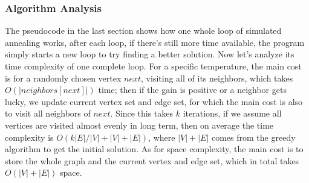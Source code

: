 \documentclass[acmlarge]{acmart}
\begin{document}

\subsubsection{Algorithm Analysis}

The pseudocode in the last section shows how one whole loop of simulated annealing works, after each loop, if there's still more time available, the program simply starts a new loop to try finding a better solution. Now let's analyze its time complexity of one complete loop. For a specific temperature, the main cost is for a randomly chosen vertex $next$, visiting all of its neighbors, which takes $O(|neighbors[next]|)$ time; then if the gain is positive or a neighbor gets lucky, we update current vertex set and edge set, for which the main cost is also to visit all neighbors of $next$. Since this takes $k$ iterations, if we assume all vertices are visited almost evenly in long term, then on average the time complexity is $O(k|E|/|V| + |V| + |E|)$, where $|V|+|E|$ comes from the greedy algorithm to get the initial solution. As for space complexity, the main cost is to store the whole graph and the current vertex and edge set, which in total takes $O(|V|+|E|)$ space.\\\\
\end{document}
